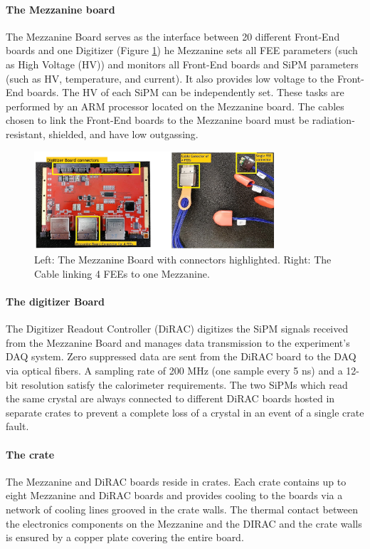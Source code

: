 \paragraph{The Mezzanine board}
The Mezzanine Board serves as the interface between 20 different 
Front-End boards and one Digitizer (Figure \ref{fig:mezzanine}) 
he Mezzanine sets all FEE parameters (such as High Voltage (HV)) and 
monitors all Front-End boards and SiPM parameters (such as HV, temperature, and current). 
It also provides low voltage to the Front-End boards. The HV of each SiPM can be 
independently set. These tasks are performed by an ARM processor located on the 
Mezzanine board. The cables chosen to link the Front-End boards to the 
Mezzanine board must be radiation-resistant, shielded, and have low outgassing. 
\begin{figure}[!h]
    \centering
    \includegraphics[width =0.8\textwidth]{figures/png/Screenshot_20240706_144234.png}
    \caption[The calorimeter Mezzanine Board and FEE.]{Left: The Mezzanine Board with connectors highlighted. 
    Right: The Cable linking 4 FEEs to one Mezzanine.}
    \label{fig:mezzanine}
\end{figure}



\paragraph{The digitizer Board}
The Digitizer Readout Controller (DiRAC) digitizes the SiPM 
signals received from the Mezzanine Board and manages data 
transmission to the experiment's DAQ system. Zero suppressed 
data are sent from the DiRAC board to the DAQ via optical fibers. 
A sampling rate of 200 MHz (one sample every 5 ns) and a 12-bit resolution 
satisfy the calorimeter requirements. The two SiPMs which read the same 
crystal are always connected to different DiRAC boards hosted in separate 
crates to prevent a complete loss of a crystal 
in an event of a single crate fault.

\paragraph{The crate}
The Mezzanine and DiRAC boards reside in crates.
Each crate contains up to eight Mezzanine 
and DiRAC boards and provides cooling to the boards via a network of cooling lines grooved in the crate walls.
The thermal contact between the electronics components on the Mezzanine and the DIRAC
and the crate walls is ensured by a copper plate covering the entire board.
